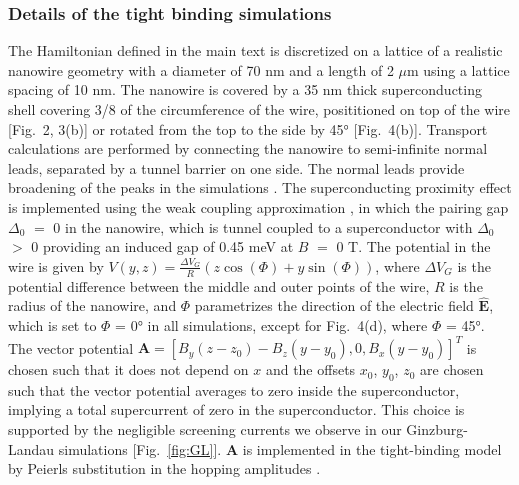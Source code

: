 \subsubsection{Details of the tight binding simulations}
The Hamiltonian defined in the main text is discretized on a lattice of a realistic nanowire geometry with a diameter of 70 nm and a length of 2 $\mu$m using a lattice spacing of 10 nm.
The nanowire is covered by a 35 nm thick superconducting shell covering 3/8 of the circumference of the wire, posititioned on top of the wire [Fig.~2, 3(b)] or rotated from the top to the side by \ang{45} [Fig.~4(b)].
Transport calculations are performed by connecting the nanowire to semi-infinite normal leads, separated by a tunnel barrier on one side.
The normal leads provide broadening of the peaks in the simulations \cite{Liu2017,Danon2017}.
The superconducting proximity effect is implemented using the weak coupling approximation \cite{Nijholt2016}, in which the pairing gap $\Delta_0$ $=$ 0 in the nanowire, which is tunnel coupled to a superconductor with $\Delta_0$ $>$ 0 providing an induced gap of 0.45 meV at $B$ $=$ 0 T.
The potential in the wire is given by $V(y,z)= \frac{\Delta V_G}{R} (z\cos(\Phi)+y\sin(\Phi))$, where $\Delta V_G$ is the potential difference between the middle and outer points of the wire, $R$ is the radius of the nanowire, and $\Phi$ parametrizes the direction of the electric field $\mathbf{\hat{E}}$, which is set to $\Phi$ = \ang{0} in all simulations, except for Fig.~4(d), where $\Phi$ = \ang{45}.
The vector potential $\mathbf{A} = \left[B_y(z-z_0)-B_z(y-y_0),0,B_x(y-y_0)\right]^T$ is chosen such that it does not depend on $x$ and the offsets $x_0$, $y_0$, $z_0$ are chosen such that the vector potential averages to zero inside the superconductor, implying a total supercurrent of zero in the superconductor.
This choice is supported by the negligible screening currents we observe in our Ginzburg-Landau simulations [Fig.~\ref{fig:GL}].
$\mathbf{A}$ is implemented in the tight-binding model by Peierls substitution in the hopping amplitudes \cite{Hofstader1976}.

